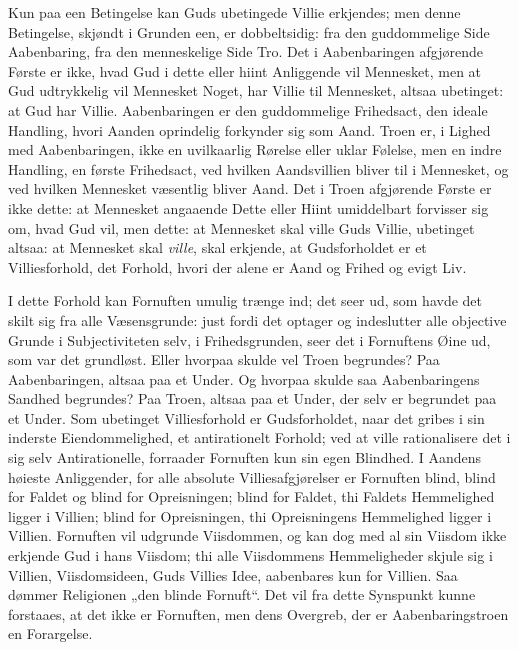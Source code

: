 \documentclass[12pt]{book}
\begin{document}
Kun paa een Betingelse kan Guds ubetingede Villie erkjendes; men
denne Betingelse, skjøndt i Grunden een, er dobbeltsidig: fra den
guddommelige Side Aabenbaring, fra den menneskelige Side Tro. Det i
Aabenbaringen afgjørende Første er ikke, hvad Gud i dette eller
hiint Anliggende vil Mennesket, men at Gud udtrykkelig vil Mennesket
Noget, har Villie til Mennesket, altsaa ubetinget: at Gud har
Villie. Aabenbaringen er den guddommelige Frihedsact, den ideale
Handling, hvori Aanden oprindelig forkynder sig som Aand. Troen er,
i Lighed med Aabenbaringen, ikke en uvilkaarlig Rørelse eller uklar
Følelse, men en indre Handling, en første Frihedsact, ved hvilken
Aandsvillien bliver til i Mennesket, og ved hvilken Mennesket
væsentlig bliver Aand. Det i Troen afgjørende Første er ikke dette:
at Mennesket angaaende Dette eller Hiint umiddelbart forvisser sig
om, hvad Gud vil, men dette: at Mennesket skal ville Guds Villie,
ubetinget altsaa: at Mennesket skal \emph{ville}, skal erkjende, at
Gudsforholdet er et Villiesforhold, det Forhold, hvori der alene er
Aand og Frihed og evigt Liv.

I dette Forhold kan Fornuften umulig trænge ind; det seer ud, som
havde det skilt sig fra alle Væsensgrunde: just fordi det optager og
indeslutter alle objective Grunde i Subjectiviteten selv, i
Frihedsgrunden, seer det i Fornuftens Øine ud, som var det
grundløst. Eller hvorpaa skulde vel Troen begrundes? Paa
Aabenbaringen, altsaa paa et Under. Og hvorpaa skulde saa
Aabenbaringens Sandhed begrundes? Paa Troen, altsaa paa et Under,
der selv er begrundet paa et Under. Som ubetinget Villiesforhold er
Gudsforholdet, naar det gribes i sin inderste Eiendommelighed, et
antirationelt Forhold; ved at ville rationalisere det i sig selv
Antirationelle, forraader Fornuften kun sin egen Blindhed. I Aandens
høieste Anliggender, for alle absolute Villiesafgjørelser er
Fornuften blind, blind for Faldet og blind for Opreisningen; blind
for Faldet, thi Faldets Hemmelighed ligger i Villien; blind for
Opreisningen, thi Opreisningens Hemmelighed ligger i Villien.
Fornuften vil udgrunde Viisdommen, og kan dog med al sin Viisdom
ikke erkjende Gud i hans Viisdom; thi alle Viisdommens Hemmeligheder
skjule sig i Villien, Viisdomsideen, Guds Villies Idee, aabenbares
kun for Villien. Saa dømmer Religionen „den blinde Fornuft“. Det vil
fra dette Synspunkt kunne forstaaes, at det ikke er Fornuften, men
dens Overgreb, der er Aabenbaringstroen en Forargelse.
\end{document}
